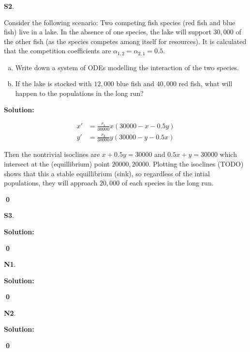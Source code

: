 \documentclass{article}
\newenvironment{problem}[1]
{
  \begin{flushleft}
  \textbf{#1}.
  \ignorespaces
}
{
  \end{flushleft}
}
\newenvironment{solution}
{
  \ignorespaces
  \textbf{Solution:}
}
{
  \ignorespacesafterend
  \begin{flushright}
  {\bfseries \qed}
  \end{flushright}
}
\begin{document}
\begin{problem}{S2}
Consider the following scenario:
Two competing fish species (red fish and blue fish) live in a lake.  In the absence of one species, the lake will support \(30,000\) of the other fish (as the species competes among itself for resources).  It is calculated that the competition coefficients are \(\alpha _{1,2}=\alpha _{2,1} = 0.5\).
\begin{enumerate}[(a)]
\item Write down a system of ODEs modelling the interaction of the two species.
\item If the lake is stocked with \(12,000\) blue fish and \(40,000\) red fish, what will happen to the populations in the long run?
\end{enumerate}
\end{problem}
\begin{solution}

\begin{align*}
x' &= \frac{r_1}{30000}x\left(30000-x-0.5y\right) \\
y' &= \frac{r_2}{30000}y\left(30000-y-0.5x\right) 
\end{align*}

Then the nontrivial isoclines are \(x+0.5y=30000\) and \(0.5x+y=30000\) which intersect at the (equillibrium) point \(20000,20000\).  Plotting the isoclines (TODO) shows that this a stable equillibrium (sink), so regardless of the intial populations, they will approach \(20,000\) of each species in the long run.

\end{solution}

\begin{problem}{S3}

\end{problem}
\begin{solution}

\end{solution}


\begin{problem}{N1}

\end{problem}
\begin{solution}

\end{solution}

\begin{problem}{N2}

\end{problem}
\begin{solution}

\end{solution}
\end{document}
